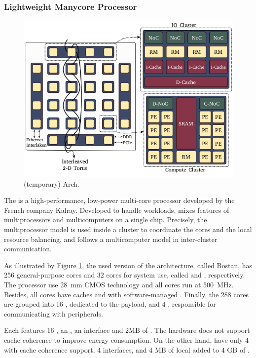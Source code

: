		\subsubsection{\mppa Lightweight Manycore Processor}
		\label{sec.mppa}

			\begin{figure}[h]
				\centering
				\includegraphics[width=.7\textwidth]{images/arch-mppa.png}

				\caption{
					(temporary) \mppa Arch.
				}\par
				\label{fig.mppa_arch}
			\end{figure}

			The \mppa is a high-performance, low-power multi-core processor
			developed by the French company Kalray.
			Developed to handle \mimd workloads, \mppa mixes features of
			multiprocessors and multicomputers on a single chip.
			Precisely, the multiprocessor model is used inside a cluster
			to coordinate the cores and the local resource balancing, and
			follows a multicomputer model in inter-cluster communication.

			As illustrated by Figure \ref{fig.mppa_arch}, the used version of
			the architecture, called Bostan, has 256 general-purpose cores and
			32 cores for system use, called \pes and \rmans, respectively.
			The processor use 28~mm CMOS technology and all cores run at 500~MHz.
			Besides, all cores have caches and \mmus with software-managed \tlbs.
			Finally, the 288 cores are grouped into 16 \cclusters, dedicated to
			the payload, and 4 \ioclusters, responsible for communicating with peripherals.

			Each \ccluster features 16 \pes, an \rman, an \noc interface and 2MB of \sram.
			The hardware does not support cache coherence to improve energy consumption.
			On the other hand, \ioclusters have only 4 \rmans with cache coherence support,
			4 \noc interfaces, and 4 MB of local \sram added to 4 GB of \dram.

